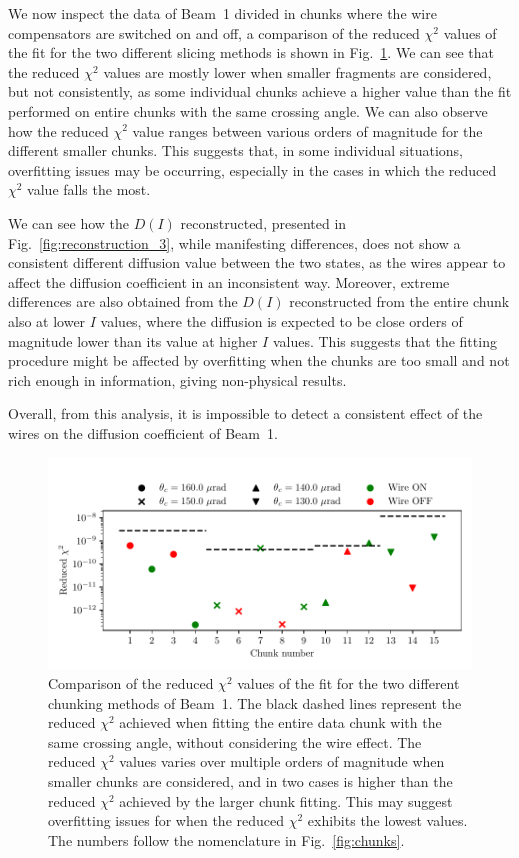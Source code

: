 We now inspect the data of Beam~1 divided in chunks where the wire compensators are switched on and off, a comparison of the reduced $\chi^2$ values of the fit for the two different slicing methods is shown in Fig.~\ref{fig:chi2}. We can see that the reduced $\chi^2$ values are mostly lower when smaller fragments are considered, but not consistently, as some individual chunks achieve a higher value than the fit performed on entire chunks with the same crossing angle. We can also observe how the reduced $\chi^2$ value ranges between various orders of magnitude for the different smaller chunks. This suggests that, in some individual situations, overfitting issues may be occurring, especially in the cases in which the reduced $\chi^2$ value falls the most.

We can see how the $D(I)$ reconstructed, presented in Fig.~\ref{fig:reconstruction_3}, while manifesting differences, does not show a consistent different diffusion value between the two states, as the wires appear to affect the diffusion coefficient in an inconsistent way. Moreover, extreme differences are also obtained from the $D(I)$ reconstructed from the entire chunk also at lower $I$ values, where the diffusion is expected to be close orders of magnitude lower than its value at higher $I$ values. This suggests that the fitting procedure might be affected by overfitting when the chunks are too small and not rich enough in information, giving non-physical results.

Overall, from this analysis, it is impossible to detect a consistent effect of the wires on the diffusion coefficient of Beam~1.

\begin{figure}[ht]
    \centering
    \includegraphics[width=1.0\textwidth]{5_wire_compensators_LHC/figs/chi_comparison.pdf}
    \caption{Comparison of the reduced $\chi^2$ values of the fit for the two different chunking methods of Beam~1. The black dashed lines represent the reduced $\chi^2$ achieved when fitting the entire data chunk with the same crossing angle, without considering the wire effect. The reduced $\chi^2$ values varies over multiple orders of magnitude when smaller chunks are considered, and in two cases is higher than the reduced $\chi^2$ achieved by the larger chunk fitting. This may suggest overfitting issues for when the reduced $\chi^2$ exhibits the lowest values. The numbers follow the nomenclature in Fig.~\ref{fig:chunks}.}
    \label{fig:chi2}
\end{figure}

